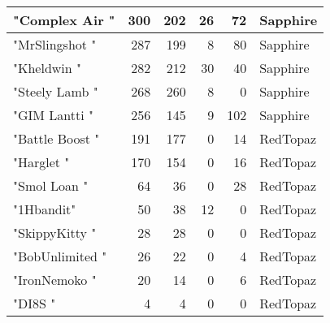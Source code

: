 \documentclass{article}
\begin{document}
\begin{table}[htbp]
\begin{tabular}{|l|r|r|r|r|l|}
"Complex Air " & 300 & 202 & 26 & 72 & Sapphire \\ \hline
"MrSlingshot " & 287 & 199 & 8 & 80 & Sapphire \\ \hline
"Kheldwin " & 282 & 212 & 30 & 40 & Sapphire \\ \hline
"Steely Lamb " & 268 & 260 & 8 & 0 & Sapphire \\ \hline
"GIM Lantti " & 256 & 145 & 9 & 102 & Sapphire \\ \hline
"Battle Boost " & 191 & 177 & 0 & 14 & RedTopaz \\ \hline
"Harglet " & 170 & 154 & 0 & 16 & RedTopaz \\ \hline
"Smol Loan " & 64 & 36 & 0 & 28 & RedTopaz \\ \hline
"1Hbandit" & 50 & 38 & 12 & 0 & RedTopaz \\ \hline
"SkippyKitty " & 28 & 28 & 0 & 0 & RedTopaz \\ \hline
"BobUnlimited " & 26 & 22 & 0 & 4 & RedTopaz \\ \hline
"IronNemoko " & 20 & 14 & 0 & 6 & RedTopaz \\ \hline
"DI8S " & 4 & 4 & 0 & 0 & RedTopaz \\ \hline
\end{tabular}
\end{table}
\end{document}
